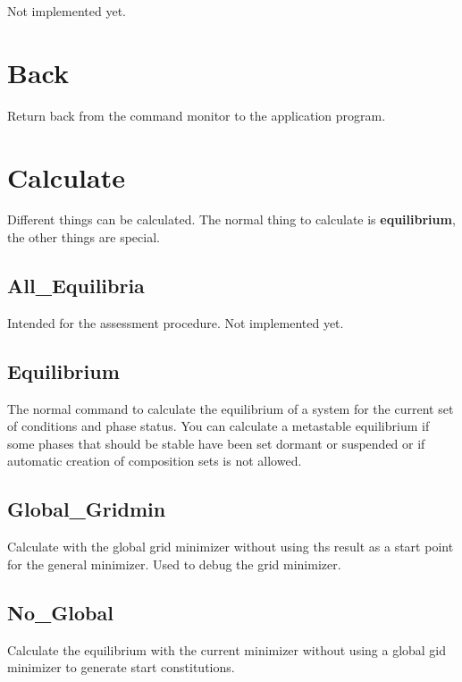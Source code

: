 \documentclass[12pt]{article}
\begin{document}
Not implemented yet.

\section{Back }

Return back from the command monitor to the application program.

\section{Calculate }

Different things can be calculated.  The normal thing to calculate is
{\bf equilibrium}, the other things are special.

\subsection{All\_Equilibria}

Intended for the assessment procedure.  Not implemented yet.

\subsection{Equilibrium}

The normal command to calculate the equilibrium of a system for the
current set of conditions and phase status.  You can calculate a
metastable equilibrium if some phases that should be stable have been
set dormant or suspended or if automatic creation of composition sets
is not allowed.

\subsection{Global\_Gridmin}

Calculate with the global grid minimizer without using ths result as a
start point for the general minimizer.  Used to debug the grid
minimizer.

\subsection{No\_Global}

Calculate the equilibrium with the current minimizer without using a
global gid minimizer to generate start constitutions.
\end{document}
